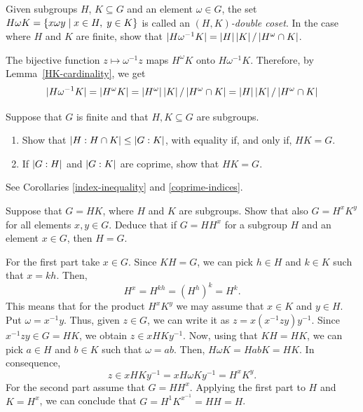 \begin{probl}\label{HwK}
    Given subgroups $H$, $K \subseteq G$ and an element $\omega \in G$, the set $H\omega K = \{ x\omega y \mid x \in H,\; y \in K \}$ is called an \textsl{$(H,K)$-double coset}. In the case where $H$ and\/ $K$ are finite, show that\/ $|H\omega^{-1} K|=\left\vert{H}\right\vert\left\vert{K}\right\vert/\left\vert{H^\omega\cap K}\right\vert$.
\end{probl}

\begin{solution} The bijective function $z\mapsto \omega^{-1} z$ maps $H^\omega K$ onto $H\omega^{-1}K$. Therefore, by Lemma~\ref{HK-cardinality}, we get
$$
    |H\omega^{-1}K|=\left\vert{H^\omega K}\right\vert=\left\vert{H^\omega}\right\vert\left\vert{K}\right\vert/\left\vert{H^\omega\cap K}\right\vert
        = \left\vert{H}\right\vert\left\vert{K}\right\vert/\left\vert{H^\omega\cap K}\right\vert
$$
 \end{solution}

\begin{probl}\label{problem-1.A.3} Suppose that $G$ is finite and that $H , K \subseteq G$ are subgroups. 
    \begin{enumerate}[\upshape a)]
        \item Show that $\left\vert{H:H \cap K}\right\vert \leq \left\vert{G:K}\right\vert$, with equality if, and only if, $HK=G$.
        \item If\/ $\left\vert{G:H}\right\vert$ and $\left\vert{G:K}\right\vert$ are coprime, show that $HK=G$.
    \end{enumerate}
\end{probl}

\begin{solution} See Corollaries \ref{index-inequality} and \ref{coprime-indices}.  \end{solution}

\begin{probl}\label{problem-1.A.4}
    Suppose that $G = H K$, where $H$ and $K$ are subgroups. Show that also $G = H^xK^y$ for all elements $x,y \in G$. Deduce that if\/ $G = HH^x$ for a subgroup $H$ and an element $x \in G$, then $H = G$.
\end{probl}

\begin{solution} For the first part take $x\in G$. Since $KH=G$, we can pick $h\in H$ and $k\in K$ such that $x=kh$. Then,
$$
    H^x=H^{kh}=(H^h)^k=H^k.
$$
This means that for the product $H^xK^y$ we may assume that $x\in K$ and $y\in H$. Put\/ $\omega=x^{-1}y$. Thus, given $z\in G$, we can write it as $z = x(x^{-1}zy)y^{-1}$. Since $x^{-1}zy\in G=HK$, we obtain $z\in xHKy^{-1}$. Now, using that $KH=HK$, we can pick $a\in H$ and $b\in K$ such that $\omega=ab$. Then, $H\omega K=HabK=HK$. In consequence,
$$
    z\in xHKy^{-1}=xH\omega Ky^{-1}=H^xK^y.
$$
For the second part assume that $G=HH^x$. Applying the first part to $H$ and $K=H^x$, we can conclude that $G=H^1K^{x^{-1}}=HH=H$.  \end{solution}

